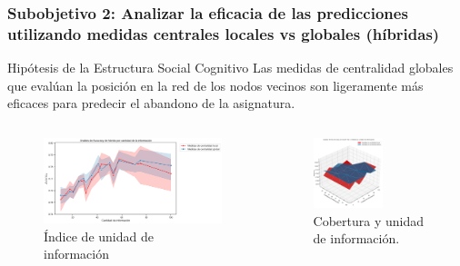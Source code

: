 \documentclass{beamer}
\begin{document}
\begin{frame}
	\frametitle{Subobjetivo 2: Analizar la eficacia de las predicciones utilizando medidas centrales  locales vs globales (híbridas)}
\begin{block}{Hipótesis de la Estructura Social Cognitivo }
	Las medidas de centralidad globales que evalúan la posición en la red de los nodos vecinos son ligeramente más eficaces para predecir el abandono de la asignatura.
\end{block}
			\begin{columns}[c]
		\begin{column}{.5\textwidth}
			\begin{figure}
				\centering
				\includegraphics[width=1\textwidth]{figs/cap7/figura_45}
				\caption{Índice de unidad de información}
			\end{figure}      
		\end{column}
		\begin{column}{.5\textwidth}
			\begin{figure}
				\centering
				\includegraphics[width=0.6\textwidth]{figs/cap7/figura_46}
			\caption{Cobertura y unidad de información.}
			\end{figure}
		\end{column}
	\end{columns}
	
	
	
\end{frame}
\end{document}
